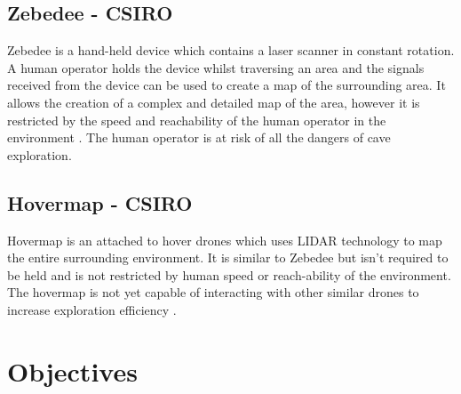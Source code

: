 \documentclass[12pt]{article}
\begin{document}
\subsection*{Zebedee - CSIRO}
Zebedee is a hand-held device which contains a laser scanner in constant rotation. A human operator holds the device whilst traversing an area and the signals received from the device can be used to create a map of the surrounding area. It allows the creation of a complex and detailed map of the area, however it is restricted by the speed and reachability of the human operator in the environment \cite{Zebedee}. The human operator is at risk of all the dangers of cave exploration.

\pagebreak[4] %

\subsection*{Hovermap - CSIRO}
Hovermap is an attached to hover drones which uses LIDAR technology to map the entire surrounding environment. It is similar to Zebedee but isn't required to be held and is not restricted by human speed or reach-ability of the environment. The hovermap is not yet capable of interacting with other similar drones to increase exploration efficiency \cite{Hovermap}.

\section{Objectives}
\end{document}
